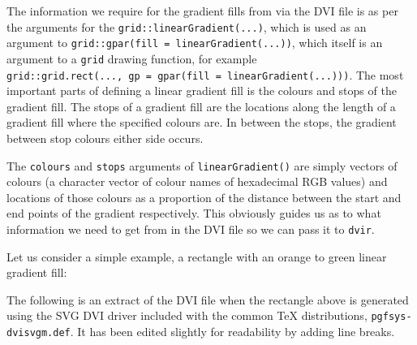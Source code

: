 \documentclass[]{article}
\begin{document}
The information we require for the gradient fills from \Tikz{} via the
DVI file is as per the arguments for the
\texttt{grid::linearGradient(...)}, which is used as an argument to
\texttt{grid::gpar(fill\ =\ linearGradient(...))}, which itself is an
argument to a \texttt{grid} drawing function, for example
\texttt{grid::grid.rect(...,\ gp\ =\ gpar(fill\ =\ linearGradient(...)))}.
The most important parts of defining a linear gradient fill is the
colours and stops of the gradient fill. The stops of a gradient fill are
the locations along the length of a gradient fill where the specified
colours are. In between the stops, the gradient between stop colours
either side occurs.

The \texttt{colours} and \texttt{stops} arguments of
\texttt{linearGradient()} are simply vectors of colours (a character
vector of colour names of hexadecimal RGB values) and locations of those
colours as a proportion of the distance between the start and end points
of the gradient respectively. This obviously guides us as to what
information we need to get from \Tikz{} in the DVI file so we can pass
it to \texttt{dvir}.

Let us consider a simple example, a rectangle with an orange to green
linear gradient fill:

\begin{figure}
\end{figure}

The following is an extract of the DVI file when the rectangle above is
generated using the SVG DVI driver included with the common \TeX{}
distributions, \texttt{pgfsys-dvisvgm.def}. It has been edited slightly
for readability by adding line breaks.
\end{document}
